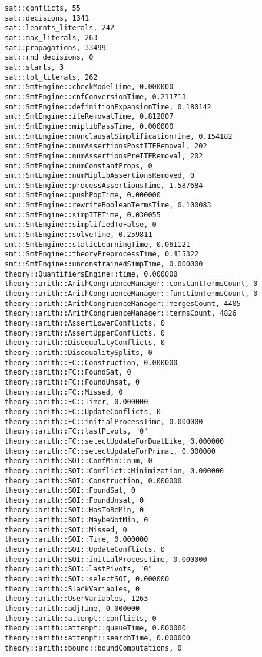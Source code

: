 \begin{lstlisting}
sat::conflicts, 55
sat::decisions, 1341
sat::learnts_literals, 242
sat::max_literals, 263
sat::propagations, 33499
sat::rnd_decisions, 0
sat::starts, 3
sat::tot_literals, 262
smt::SmtEngine::checkModelTime, 0.000000
smt::SmtEngine::cnfConversionTime, 0.211713
smt::SmtEngine::definitionExpansionTime, 0.180142
smt::SmtEngine::iteRemovalTime, 0.812807
smt::SmtEngine::miplibPassTime, 0.000000
smt::SmtEngine::nonclausalSimplificationTime, 0.154182
smt::SmtEngine::numAssertionsPostITERemoval, 202
smt::SmtEngine::numAssertionsPreITERemoval, 202
smt::SmtEngine::numConstantProps, 0
smt::SmtEngine::numMiplibAssertionsRemoved, 0
smt::SmtEngine::processAssertionsTime, 1.587684
smt::SmtEngine::pushPopTime, 0.000000
smt::SmtEngine::rewriteBooleanTermsTime, 0.100083
smt::SmtEngine::simpITETime, 0.030055
smt::SmtEngine::simplifiedToFalse, 0
smt::SmtEngine::solveTime, 0.259811
smt::SmtEngine::staticLearningTime, 0.061121
smt::SmtEngine::theoryPreprocessTime, 0.415322
smt::SmtEngine::unconstrainedSimpTime, 0.000000
theory::QuantifiersEngine::time, 0.000000
theory::arith::ArithCongruenceManager::constantTermsCount, 0
theory::arith::ArithCongruenceManager::functionTermsCount, 0
theory::arith::ArithCongruenceManager::mergesCount, 4405
theory::arith::ArithCongruenceManager::termsCount, 4826
theory::arith::AssertLowerConflicts, 0
theory::arith::AssertUpperConflicts, 0
theory::arith::DisequalityConflicts, 0
theory::arith::DisequalitySplits, 0
theory::arith::FC::Construction, 0.000000
theory::arith::FC::FoundSat, 0
theory::arith::FC::FoundUnsat, 0
theory::arith::FC::Missed, 0
theory::arith::FC::Timer, 0.000000
theory::arith::FC::UpdateConflicts, 0
theory::arith::FC::initialProcessTime, 0.000000
theory::arith::FC::lastPivots, "0"
theory::arith::FC::selectUpdateForDualLike, 0.000000
theory::arith::FC::selectUpdateForPrimal, 0.000000
theory::arith::SOI::ConfMin::num, 0
theory::arith::SOI::Conflict::Minimization, 0.000000
theory::arith::SOI::Construction, 0.000000
theory::arith::SOI::FoundSat, 0
theory::arith::SOI::FoundUnsat, 0
theory::arith::SOI::HasToBeMin, 0
theory::arith::SOI::MaybeNotMin, 0
theory::arith::SOI::Missed, 0
theory::arith::SOI::Time, 0.000000
theory::arith::SOI::UpdateConflicts, 0
theory::arith::SOI::initialProcessTime, 0.000000
theory::arith::SOI::lastPivots, "0"
theory::arith::SOI::selectSOI, 0.000000
theory::arith::SlackVariables, 0
theory::arith::UserVariables, 1263
theory::arith::adjTime, 0.000000
theory::arith::attempt::conflicts, 0
theory::arith::attempt::queueTime, 0.000000
theory::arith::attempt::searchTime, 0.000000
theory::arith::bound::boundComputations, 0

\end{lstlisting}
